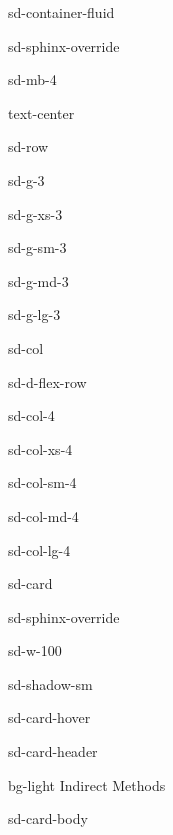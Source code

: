 \documentclass[letterpaper,10pt,english]{jupyterBook}
\begin{document}
\begin{sphinxuseclass}{sd-container-fluid}
\begin{sphinxuseclass}{sd-sphinx-override}
\begin{sphinxuseclass}{sd-mb-4}
\begin{sphinxuseclass}{text-center}
\begin{sphinxuseclass}{sd-row}
\begin{sphinxuseclass}{sd-g-3}
\begin{sphinxuseclass}{sd-g-xs-3}
\begin{sphinxuseclass}{sd-g-sm-3}
\begin{sphinxuseclass}{sd-g-md-3}
\begin{sphinxuseclass}{sd-g-lg-3}
\begin{sphinxuseclass}{sd-col}
\begin{sphinxuseclass}{sd-d-flex-row}
\begin{sphinxuseclass}{sd-col-4}
\begin{sphinxuseclass}{sd-col-xs-4}
\begin{sphinxuseclass}{sd-col-sm-4}
\begin{sphinxuseclass}{sd-col-md-4}
\begin{sphinxuseclass}{sd-col-lg-4}
\begin{sphinxuseclass}{sd-card}
\begin{sphinxuseclass}{sd-sphinx-override}
\begin{sphinxuseclass}{sd-w-100}
\begin{sphinxuseclass}{sd-shadow-sm}
\begin{sphinxuseclass}{sd-card-hover}
\begin{sphinxuseclass}{sd-card-header}
\begin{sphinxuseclass}{bg-light}
\sphinxAtStartPar
Indirect Methods

\end{sphinxuseclass}
\end{sphinxuseclass}
\begin{sphinxuseclass}{sd-card-body}
\begin{figure}[htbp]
\centering

\noindent{}
\end{figure}

\end{sphinxuseclass}{\hyperref[\detokenize{7_Indirect_methods/7.0_Indirect_methods::doc}]{}}
\end{sphinxuseclass}
\end{sphinxuseclass}
\end{sphinxuseclass}
\end{sphinxuseclass}
\end{sphinxuseclass}
\end{sphinxuseclass}
\end{sphinxuseclass}
\end{sphinxuseclass}
\end{sphinxuseclass}
\end{sphinxuseclass}
\end{sphinxuseclass}
\end{sphinxuseclass}
\end{sphinxuseclass}
\end{sphinxuseclass}
\end{sphinxuseclass}
\end{sphinxuseclass}
\end{sphinxuseclass}
\end{sphinxuseclass}
\end{sphinxuseclass}
\end{sphinxuseclass}
\end{sphinxuseclass}
\end{sphinxuseclass}
\sphinxAtStartPar
\end{document}

